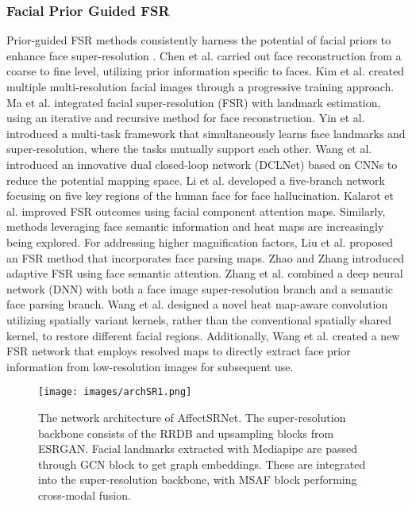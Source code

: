 \subsubsection{Facial Prior Guided FSR}
Prior-guided FSR methods consistently harness the potential of facial priors to enhance face super-resolution \cite{fsr21,fsr22,fsr23}. Chen et al. \cite{fsr24} carried out face reconstruction from a coarse to fine level, utilizing prior information specific to faces. Kim et al. \cite{fsr25} created multiple multi-resolution facial images through a progressive training approach. Ma et al. \cite{fsr26} integrated facial super-resolution (FSR) with landmark estimation, using an iterative and recursive method for face reconstruction. Yin et al. \cite{fsr27} introduced a multi-task framework that simultaneously learns face landmarks and super-resolution, where the tasks mutually support each other. Wang et al. \cite{fsr28} introduced an innovative dual closed-loop network (DCLNet) based on CNNs to reduce the potential mapping space. Li et al. \cite{fsr29} developed a five-branch network focusing on five key regions of the human face for face hallucination. Kalarot et al. \cite{fsr30} improved FSR outcomes using facial component attention maps. Similarly, methods leveraging face semantic information and heat maps are increasingly being explored. For addressing higher magnification factors, Liu et al. \cite{fsr31} proposed an FSR method that incorporates face parsing maps. Zhao and Zhang \cite{fsr32} introduced adaptive FSR using face semantic attention. Zhang et al. \cite{fsr33} combined a deep neural network (DNN) with both a face image super-resolution branch and a semantic face parsing branch. Wang et al. \cite{fsr34} designed a novel heat map-aware convolution utilizing spatially variant kernels, rather than the conventional spatially shared kernel, to restore different facial regions. Additionally, Wang et al. \cite{fsr35} created a new FSR network that employs resolved maps to directly extract face prior information from low-resolution images for subsequent use.










\begin{figure*}
    \centering
    \texttt{[image: images/archSR1.png]}
    \caption{\label{arc} The network architecture of AffectSRNet. The super-resolution backbone consists of the RRDB and upsampling blocks from ESRGAN\cite{fsr36_esrgan}. Facial landmarks extracted with Mediapipe\cite{Mediapipe} are passed through GCN block to get graph embeddings. These are integrated into the super-resolution backbone, with MSAF block performing cross-modal fusion.}
   
\end{figure*}
